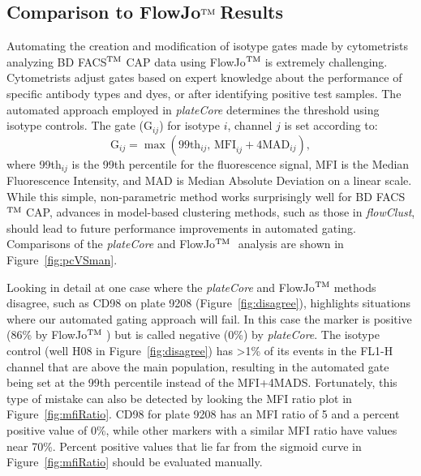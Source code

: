 \documentclass[12pt]{article}
\newcommand{\Rpackage}[1]{{\textit{#1}}}
\def\tm{$^{\rm \text{TM }}$}
\begin{document}
\clearpage
\subsection*{Comparison to FlowJo\tm Results}
Automating the creation and modification of isotype gates made by cytometrists analyzing BD FACS\tm CAP data
using FlowJo\tm is extremely challenging. Cytometrists adjust gates based on expert knowledge about the performance of 
specific antibody types and dyes, or after identifying positive test samples. The automated approach
employed in \Rpackage{plateCore} determines the threshold using isotype controls.  The gate (G$_{ij}$) for isotype $i$, channel $j$
is set according to:
\begin{equation}
\text{G}_{ij} = \max (\text{99th}_{ij} \text{, MFI}_{ij}+ 4 \text{MAD}_{ij}),
\label{isoGate}
\end{equation}
where 99th$_{ij}$ is the 99th percentile for the fluorescence signal,
MFI is the Median Fluorescence Intensity, and MAD is Median Absolute Deviation
on a linear scale. While this simple, non-parametric method works surprisingly well for BD FACS\tm CAP,
advances in model-based clustering methods, such as those in \Rpackage{flowClust}, should lead
to future performance improvements in automated gating. Comparisons of the \Rpackage{plateCore} and FlowJo\tm 
analysis are shown in Figure~\ref{fig:pcVSman}.

Looking in detail at one case where the \Rpackage{plateCore} and FlowJo\tm methods disagree, such
as CD98 on plate 9208 (Figure~\ref{fig:disagree}), highlights situations where our automated gating
approach will fail. In this case the marker is positive (86\% by FlowJo\tm) but is 
called negative (0\%) by \Rpackage{plateCore}. The isotype control (well H08 in Figure~\ref{fig:disagree})
has >1\% of its events in the FL1-H channel that are above the main population, resulting in the automated
gate being set at the 99th percentile instead of the MFI+4MADS. Fortunately, this type of mistake can also
be detected by looking the MFI ratio plot in Figure~\ref{fig:mfiRatio}. CD98 for plate 9208 has an MFI
ratio of 5 and a percent positive value of 0\%, while other markers with a similar MFI ratio have values
near 70\%. Percent positive values that lie far from the sigmoid curve in Figure~\ref{fig:mfiRatio}
should be evaluated manually.

\end{document}
